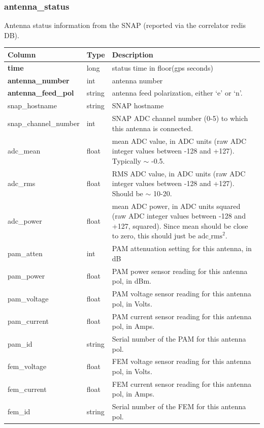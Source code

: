 \documentclass{article}
\begin{document}
{\subsubsection{antenna\_status}
Antenna status information from the SNAP (reported via the correlator redis DB).
\begin{center}
\begin{tabular}{| p{4cm} | p{2cm} | p{10cm} |}
\hline
 {\bf Column} & {\bf Type}  & {\bf Description} \\ [0.5ex]  \hline\hline
\textbf{time} & long & status time in floor(gps seconds)\\ \hline
\textbf{antenna\_number} & int & antenna number \\ \hline
\textbf{antenna\_feed\_pol} & string & antenna feed polarization, either `e' or `n'. \\ \hline
snap\_hostname & string & SNAP hostname \\ \hline
snap\_channel\_number & int & SNAP ADC channel number (0-5) to which this antenna is connected. \\ \hline
adc\_mean & float & mean ADC value, in ADC units (raw ADC integer values between -128 and +127). Typically $\sim$ -0.5. \\ \hline
adc\_rms & float & RMS ADC value, in ADC units (raw ADC integer values between -128 and +127).  Should be $\sim$ 10-20. \\ \hline
adc\_power & float & mean ADC power, in ADC units squared (raw ADC integer values between -128 and +127, squared). Since mean should be close to zero, this should just be $\text{adc\_rms}^2$. \\ \hline
pam\_atten & int & PAM attenuation setting for this antenna, in dB \\ \hline
pam\_power & float & PAM power sensor reading for this antenna pol, in dBm. \\ \hline
pam\_voltage & float & PAM voltage sensor reading for this antenna pol, in Volts. \\ \hline
pam\_current & float & PAM current sensor reading for this antenna pol, in Amps. \\ \hline
pam\_id & string & Serial number of the PAM for this antenna pol. \\ \hline
fem\_voltage & float & FEM voltage sensor reading for this antenna pol, in Volts. \\ \hline
fem\_current & float & FEM current sensor reading for this antenna pol, in Amps. \\ \hline
fem\_id & string & Serial number of the FEM for this antenna pol. \\ \hline

\end{tabular}
\end{center}}
\end{document}
